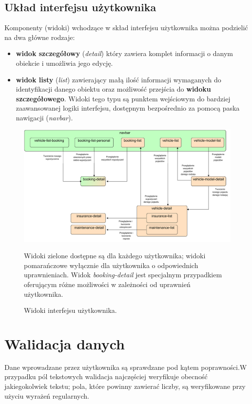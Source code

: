 \documentclass[eng,printmode,openany]{mgr}
\begin{document}
	\subsection{Układ interfejsu użytkownika}
	Komponenty (widoki) wchodzące w skład interfejsu użytkownika można podzielić na dwa główne rodzaje:
	\begin{itemize}
		\item \textbf{widok szczegółowy} (\textit{detail}) który zawiera komplet informacji o danym obiekcie i umożliwia jego edycję.
		\item \textbf{widok listy} (\textit{list}) zawierający małą ilość informacji wymaganych do identyfikacji danego obiektu oraz możliwość przejścia do \textbf{widoku szczegółowego}. Widoki tego typu są punktem wejściowym do bardziej zaawansowanej logiki interfejsu, dostępnym bezpośrednio za pomocą paska nawigacji (\textit{navbar}).
	\end{itemize}
	\begin{figure}[H]
		\centering
		\includegraphics[width=\textwidth]{images/angular_views.png}
		\caption{Widoki interfejsu użytkownika.}
		\small 
		Widoki zielone dostępne są dla każdego użytkownika; widoki pomarańczowe wyłącznie dla użytkownika o odpowiednich uprawnieniach. Widok \textit{booking-detail} jest specjalnym przypadkiem oferującym różne możliwości w zależności od uprawnień użytkownika.
	\end{figure}

	\section{Walidacja danych}
	Dane wprowadzane przez użytkownika są sprawdzane pod kątem poprawności.W przypadku pól tekstowych walidacja najczęściej weryfikuje obecność jakiegokolwiek tekstu; pola, które powinny zawierać liczby, są weryfikowane przy użyciu wyrażeń regularnych.
	
\end{document}
